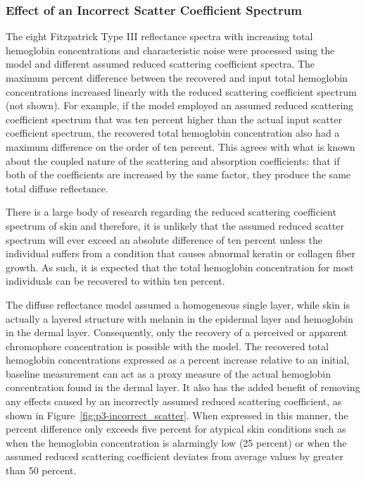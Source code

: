 \subsubsection{Effect of an Incorrect Scatter Coefficient Spectrum}
The eight Fitzpatrick Type III reflectance spectra with increasing total hemoglobin concentrations and characteristic noise were processed using the model and different assumed reduced scattering coefficient spectra. The maximum percent difference between the recovered and input total hemoglobin concentrations increased linearly with the reduced scattering coefficient spectrum (not shown). For example, if the model employed an assumed reduced scattering coefficient spectrum that was ten percent higher than the actual input scatter coefficient spectrum, the recovered total hemoglobin concentration also had a maximum difference on the order of ten percent. This agrees with what is known about the coupled nature of the scattering and absorption coefficients: that if both of the coefficients are increased by the same factor, they produce the same total diffuse reflectance.

There is a large body of research regarding the reduced scattering coefficient spectrum of skin and therefore, it is unlikely that the assumed reduced scatter spectrum will ever exceed an absolute difference of ten percent unless the individual suffers from a condition that causes abnormal keratin or collagen fiber growth. As such, it is expected that the total hemoglobin concentration for most individuals can be recovered to within ten percent.

The diffuse reflectance model assumed a homogeneous single layer, while skin is actually a layered structure with melanin in the epidermal layer and hemoglobin in the dermal layer. Consequently, only the recovery of a perceived or apparent chromophore concentration is possible with the model. The recovered total hemoglobin concentrations expressed as a percent increase relative to an initial, baseline measurement can act as a proxy measure of the actual hemoglobin concentration found in the dermal layer. It also has the added benefit of removing any effects caused by an incorrectly assumed reduced scattering coefficient, as shown in Figure~\ref{fig:p3-incorrect_scatter}. When expressed in this manner, the percent difference only exceeds five percent for atypical skin conditions such as when the hemoglobin concentration is alarmingly low (25 percent) or when the assumed reduced scattering coefficient deviates from average values by greater than 50 percent.

